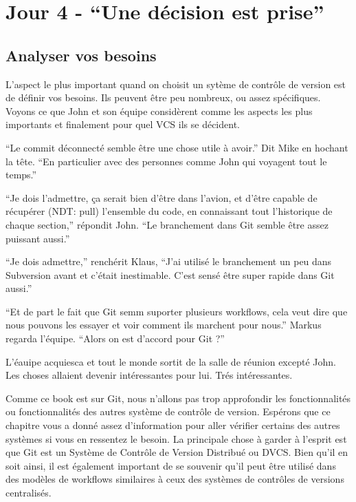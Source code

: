 \section{Jour 4 - ``Une décision est prise''}
\subsection{Analyser vos besoins}
L'aspect le plus important quand on choisit un sytème de contrôle de version est de définir vos besoins.
Ils peuvent être peu nombreux, ou assez spécifiques. Voyons ce que John et son équipe considèrent comme les aspects les plus importants et finalement pour quel VCS ils se décident.

\begin{trenches}
``Le commit déconnecté semble être une chose utile à avoir.'' Dit Mike en hochant la tête.
``En particulier avec des personnes comme John qui voyagent tout le temps.''

``Je dois l'admettre, ça serait bien d'être dans l'avion, et d'être capable de récupérer (NDT: pull) l'ensemble du code, en connaissant tout l'historique de chaque section,'' répondit John.
``Le branchement dans Git semble être assez puissant aussi.''

``Je dois admettre,'' renchérit Klaus, ``J'ai utilisé le branchement un peu dans Subversion avant et c'était inestimable.
C'est sensé être super rapide dans Git aussi.''

``Et de part le fait que Git semm suporter plusieurs workflows, cela veut dire que nous pouvons les essayer et voir comment ils marchent pour nous.'' Markus regarda l'équipe.
``Alors on est d'accord pour Git ?''

L'éauipe acquiesca et tout le monde sortit de la salle de réunion excepté John.
Les choses allaient devenir intéressantes pour lui.
Trés intéressantes.
\end{trenches}

Comme ce book est sur Git, nous n'allons pas trop approfondir les fonctionnalités ou fonctionnalités des autres système de contrôle de version.
Espérons que ce chapitre vous a donné assez d'information pour aller vérifier certains des autres systèmes si vous en ressentez le besoin.
La principale chose à garder à l'esprit est que Git est un Système de Contrôle de Version Distribué ou DVCS.
Bien qu'il en soit ainsi, il est également important de se souvenir qu'il peut être utilisé dans des modèles de workflows similaires à ceux des systèmes de contrôles de versions centralisés.

